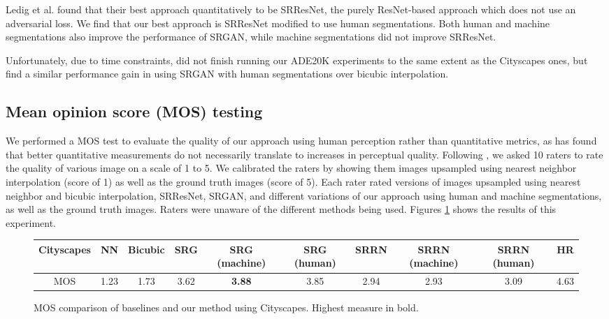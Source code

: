 \documentclass[10pt,twocolumn,letterpaper]{article}
\begin{document}
Ledig et al. \cite{SRGAN} found that their best approach quantitatively to be
SRResNet, the purely ResNet-based approach which does not use an adversarial
loss. We find that our best approach is SRResNet modified to use human
segmentations. Both human and machine segmentations also improve the
performance of SRGAN, while machine segmentations did not improve SRResNet.

Unfortunately, due to time constraints, did not finish running our ADE20K
experiments to the same extent as the Cityscapes ones, but find a similar
performance gain in using SRGAN with human segmentations over bicubic
interpolation.

\subsection{Mean opinion score (MOS) testing}
We performed a MOS test to evaluate the quality of our approach using human
perception rather than quantitative metrics, as \cite{SRGAN} has found that
better quantitative measurements do not necessarily translate to increases in
perceptual quality. Following \cite{SRGAN}, we asked 10 raters to rate the
quality of various image on a scale of 1 to 5. We calibrated the raters by
showing them images upsampled using nearest neighbor interpolation (score of 1)
as well as the ground truth images (score of 5). Each rater rated versions of
images upsampled using nearest neighbor and bicubic interpolation, SRResNet,
SRGAN, and different variations of our approach using human and machine
segmentations, as well as the ground truth images. Raters were unaware of the
different methods being used. Figures \ref{fig:mos} shows the results of this
experiment.

\begin{figure}[ht!]
    \begin{center}
        \small
        \begin{tabular}{c ccccccccc}
            \textbf{Cityscapes} & NN & Bicubic & SRG & SRG (machine) & SRG
            (human) & SRRN & SRRN (machine) & SRRN (human) & HR \\
            \hline
            MOS & 1.23 & 1.73 & 3.62 & \textbf{3.88} & 3.85 & 2.94 & 2.93 & 3.09 & 4.63
        \end{tabular}
    \end{center}
    \caption{MOS comparison of baselines and our method using Cityscapes. Highest
    measure in bold.}
    \label{fig:mos}
\end{figure}
\end{document}
